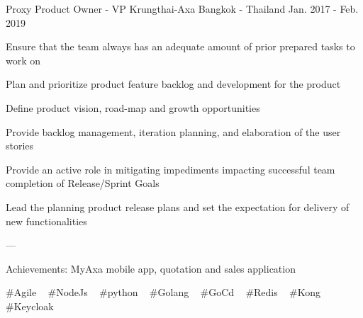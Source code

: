 \begin{cventries}
  \cventry
    {Proxy Product Owner - VP} %
    {Krungthai-Axa} %
    {Bangkok - Thailand} %
    {Jan. 2017 - Feb. 2019} %
    {
      \begin{cvitems} %
        \item {Ensure that the team always has an adequate amount of prior prepared tasks to work on}
        \item {Plan and prioritize product feature backlog and development for the product}
        \item {Define product vision, road-map and growth opportunities}
        \item {Provide backlog management, iteration planning, and elaboration of the user stories}
        \item {Provide an active role in mitigating impediments impacting successful team completion of Release/Sprint Goals}
        \item {Lead the planning product release plans and set the expectation for delivery of new   functionalities}
        \item {---}
        \item {Achievements: MyAxa mobile app, quotation and sales application}
      \end{cvitems}
    }
    {
      \#Agile ~
      \#NodeJs ~
      \#python ~
      \#Golang ~
      \#GoCd ~
      \#Redis ~
      \#Kong ~
      \#Keycloak ~
    }


\end{cventries}
